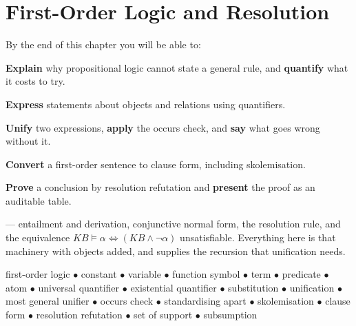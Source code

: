 \chapter{First-Order Logic and Resolution}\label{ch:fol}

\begin{outcomes}
By the end of this chapter you will be able to:
\begin{tight}
  \item \textbf{Explain} why propositional logic cannot state a general rule, and
        \textbf{quantify} what it costs to try.
  \item \textbf{Express} statements about objects and relations using quantifiers.
  \item \textbf{Unify} two expressions, \textbf{apply} the occurs check, and
        \textbf{say} what goes wrong without it.
  \item \textbf{Convert} a first-order sentence to clause form, including
        skolemisation.
  \item \textbf{Prove} a conclusion by resolution refutation and \textbf{present}
        the proof as an auditable table.
\end{tight}
\end{outcomes}

\begin{prereq}
 --- entailment and derivation, conjunctive normal form, the
resolution rule, and the equivalence
$\mathit{KB} \models \alpha \Leftrightarrow (\mathit{KB} \wedge \neg\alpha)$
unsatisfiable. Everything here is that machinery with objects added, and
 supplies the recursion that unification needs.
\end{prereq}

\begin{keyterms}
first-order logic $\bullet$ constant $\bullet$ variable $\bullet$ function symbol
$\bullet$ term $\bullet$ predicate $\bullet$ atom $\bullet$ universal
quantifier $\bullet$ existential quantifier $\bullet$ substitution $\bullet$
unification $\bullet$ most general unifier $\bullet$ occurs check $\bullet$
standardising apart $\bullet$ skolemisation $\bullet$ clause form $\bullet$
resolution refutation $\bullet$ set of support $\bullet$ subsumption
\end{keyterms}

